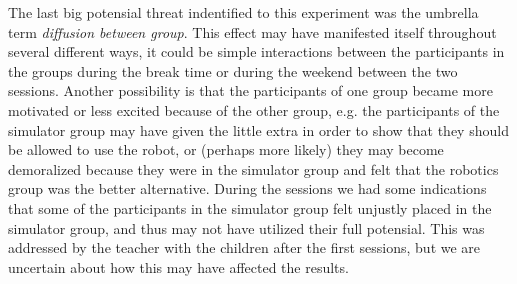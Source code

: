 	\bigskip\noindent
	The last big potensial threat indentified to this experiment was the umbrella term \textit{diffusion between group}. This effect may have manifested itself throughout several different ways, it could be simple interactions between the participants in the groups during the break time or during the weekend between the two sessions. Another possibility is that the participants of one group became more motivated or less excited because of the other group, e.g. the participants of the simulator group may have given the little extra in order to show that they should be allowed to use the robot, or (perhaps more likely) they may become demoralized because they were in the simulator group and felt that the robotics group was the better alternative.
	During the sessions we had some indications that some of the participants in the simulator group felt unjustly placed in the simulator group, and thus may not have utilized their full potensial. 
	This was addressed by the teacher with the children after the first sessions, but we are uncertain about how this may have affected the results. 